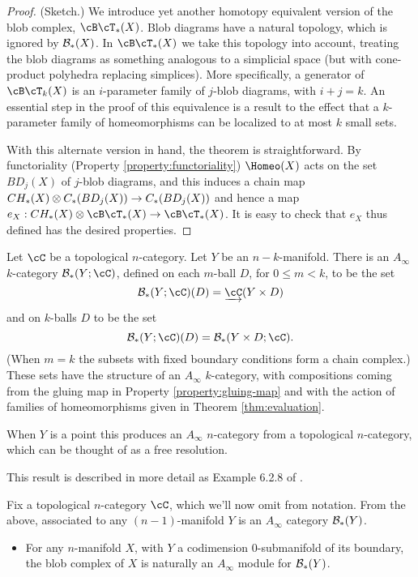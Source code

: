 \documentclass{pnastwo}
\begin{document}
\begin{article}
\begin{proof}(Sketch.)
We introduce yet another homotopy equivalent version of
the blob complex, $\cB\cT_*(X)$.
Blob diagrams have a natural topology, which is ignored by ${\mathcal B}_*(X)$.
In $\cB\cT_*(X)$ we take this topology into account, treating the blob diagrams as something
analogous to a simplicial space (but with cone-product polyhedra replacing simplices).
More specifically, a generator of $\cB\cT_k(X)$ is an $i$-parameter family of $j$-blob diagrams, with $i+j=k$. 
An essential step in the proof of this equivalence is a result to the effect that a $k$-parameter 
family of homeomorphisms can be localized to at most $k$ small sets.

With this alternate version in hand, the theorem is straightforward.
By functoriality (Property \ref{property:functoriality}) $\Homeo(X)$ acts on the set $BD_j(X)$ of $j$-blob diagrams, and this
induces a chain map $CH_*(X)\otimes C_*(BD_j(X))\to C_*(BD_j(X))$
and hence a map $e_X: \CH{X} \tensor \cB\cT_*(X) \to \cB\cT_*(X)$.
It is easy to check that $e_X$ thus defined has the desired properties.
\end{proof}

\begin{thm}
\label{thm:blobs-ainfty}
Let $\cC$ be  a topological $n$-category.
Let $Y$ be an $n{-}k$-manifold. 
There is an $A_\infty$ $k$-category $\bc_*(Y;\cC)$, defined on each $m$-ball $D$, for $0 \leq m < k$, 
to be the set $$\bc_*(Y;\cC)(D) = \cl{\cC}(Y \times D)$$ and on $k$-balls $D$ to be the set 
$$\bc_*(Y;\cC)(D) = \bc_*(Y \times D; \cC).$$ 
(When $m=k$ the subsets with fixed boundary conditions form a chain complex.) 
These sets have the structure of an $A_\infty$ $k$-category, with compositions coming from the gluing map in 
Property \ref{property:gluing-map} and with the action of families of homeomorphisms given in Theorem \ref{thm:evaluation}.
\end{thm}
\begin{rem}
When $Y$ is a point this produces an $A_\infty$ $n$-category from a topological $n$-category, 
which can be thought of as a free resolution.
\end{rem}
This result is described in more detail as Example 6.2.8 of \cite{1009.5025}.

Fix a topological $n$-category $\cC$, which we'll now omit from notation.
From the above, associated to any $(n{-}1)$-manifold $Y$ is an $A_\infty$ category ${\mathcal B}_*(Y)$.

\begin{thm}
\label{thm:gluing}
\mbox{}\vspace{-0.2cm}%
\begin{itemize}
\item For any $n$-manifold $X$, with $Y$ a codimension $0$-submanifold of its boundary, 
the blob complex of $X$ is naturally an
$A_\infty$ module for ${\mathcal B}_*(Y)$.


\end{itemize}
\end{thm}
\end{article}
\end{document}
